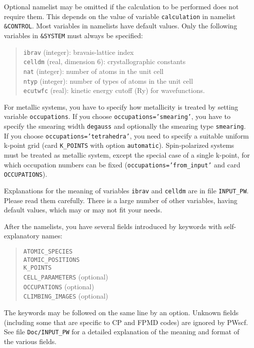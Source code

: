 \documentclass[12pt,a4paper]{article}
\begin{document}
Optional namelist may be omitted if the calculation to be performed
does not require them.
This depends on the value of variable \texttt{calculation} in namelist
\texttt{\&CONTROL}.
Most variables in namelists have default values.
Only the following variables in \texttt{\&SYSTEM} must always be
specified:
\begin{quote}
  \texttt{ibrav} (integer): bravais-lattice index\\
  \texttt{celldm} (real, dimension 6): crystallographic constants\\
  \texttt{nat} (integer): number of atoms in the unit cell\\
  \texttt{ntyp} (integer): number of types of atoms in the unit cell\\
  \texttt{ecutwfc} (real): kinetic energy cutoff (Ry) for
    wavefunctions.
\end{quote}
For metallic systems, you have to specify how metallicity
is treated by setting variable \texttt{occupations}. If you choose
\texttt{occupations='smearing'}, you have to specify the 
smearing width \texttt{degauss} and optionally the smearing 
type \texttt{smearing}. If you choose \texttt{occupations='tetrahedra'},
you need to specify a suitable uniform k-point grid (card 
\texttt{K\_POINTS} with option \texttt{automatic}). 
Spin-polarized systems must be treated as metallic system,
except the special case of a single k-point, for which
occupation numbers can be fixed (\texttt{occupations='from\_input'}
and card \texttt{OCCUPATIONS}).

Explanations for the meaning of variables \texttt{ibrav} and
\texttt{celldm} are in file \texttt{INPUT\_PW}.
Please read them carefully.
There is a large number of other variables, having default values,
which may or may not fit your needs.

After the namelists, you have several fields introduced by keywords
with self-explanatory names:

\begin{quote}
  \texttt{ATOMIC\_SPECIES}\\
  \texttt{ATOMIC\_POSITIONS}\\
  \texttt{K\_POINTS}\\
  \texttt{CELL\_PARAMETERS} (optional)\\
  \texttt{OCCUPATIONS} (optional) \\
  \texttt{CLIMBING\_IMAGES} (optional)
\end{quote}

The keywords may be followed on the same line by an option.
Unknown fields (including some that are specific to CP and FPMD codes)
are ignored by PWscf.
See file \texttt{Doc/INPUT\_PW} for a detailed explanation of the
meaning and format of the various fields.
\end{document}
